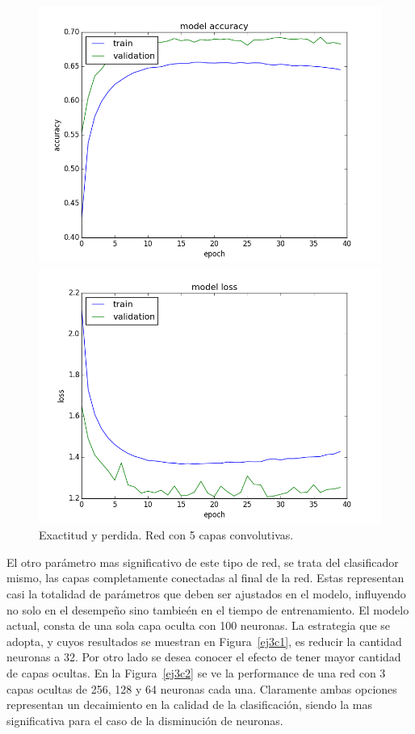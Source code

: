 \documentclass{article}[12pt, a4paper]
\begin{document}
\begin{figure}[h!]
	\begin{minipage}[h]{0.49\textwidth}
		\includegraphics[width=\textwidth]{ej3b5acc}
	\end{minipage}
	\begin{minipage}[h]{0.49\textwidth}
		\includegraphics[width=\textwidth]{ej3b5loss}
	\end{minipage}
	\caption{Exactitud y perdida. Red con 5 capas convolutivas.}
	\label{ej3b2}
\end{figure}
	
El otro par\'ametro mas significativo de este tipo de red, se trata del clasificador mismo, las
capas completamente conectadas al final de la red. Estas representan casi la totalidad de par\'ametros
que deben ser ajustados en el modelo, influyendo no solo en el desempe\~no sino tambie\'en en el tiempo
de entrenamiento. El modelo actual, consta de una sola capa oculta con 100 neuronas. La estrategia que se
adopta, y cuyos resultados se muestran en Figura~\ref{ej3c1}, es reducir la cantidad neuronas a 32. Por otro lado
se desea conocer el efecto de tener mayor cantidad de capas ocultas. En la Figura~\ref{ej3c2} se ve la performance
de una red con 3 capas ocultas de 256, 128 y 64 neuronas cada una. Claramente ambas opciones representan
un decaimiento en la calidad de la clasificaci\'on, siendo la mas significativa para el caso de la disminuci\'on
de neuronas.
\end{document}
